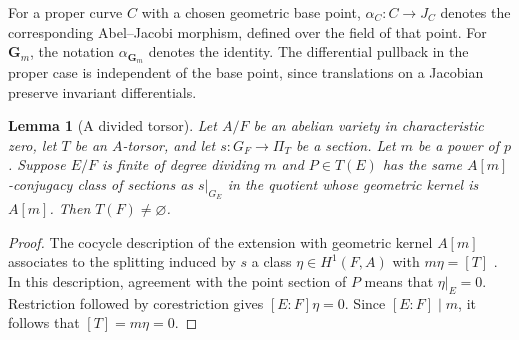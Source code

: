 \documentclass[11pt,a4paper]{article}
\numberwithin{equation}{section}
\theoremstyle{plain}
\newtheorem{lemma}[theorem]{Lemma}
\theoremstyle{definition}
\theoremstyle{remark}
\newcommand{\Gm}{\mathbf G_m}
\begin{document}
For a proper curve $C$ with a chosen geometric base point,
$\alpha_C:C\to J_C$ denotes the corresponding Abel--Jacobi morphism,
defined over the field of that point. For $\Gm$, the notation
$\alpha_{\Gm}$ denotes the identity. The differential pullback in the
proper case is independent of the base point, since translations on a
Jacobian preserve invariant differentials.

\begin{lemma}[A divided torsor]
\label{lem:divided-torsor}
Let $A/F$ be an abelian variety in characteristic zero, let $T$ be an
$A$-torsor, and let $s:G_F\to\Pi_T$ be a section. Let $m$ be a power of
$p$. Suppose
$E/F$ is finite of degree dividing $m$ and $P\in T(E)$ has the same $A[m]$-conjugacy class of sections as $s|_{G_E}$ in the
quotient whose geometric kernel is $A[m]$. Then $T(F)\ne\varnothing$.
\end{lemma}
\begin{proof}
The cocycle description of the extension with geometric kernel $A[m]$
associates to the splitting induced by $s$ a class
$\eta\in H^1(F,A)$ with $m\eta=[T]$
\cite[Proposition~2.2 and Lemma~2.3]{HarariSzamuely2009}.
In this description, agreement with the point section of $P$ means
that $\eta|_E=0$.
Restriction followed by corestriction gives $[E:F]\eta=0$. Since
$[E:F]\mid m$, it follows that $[T]=m\eta=0$.
\end{proof}
\end{document}

